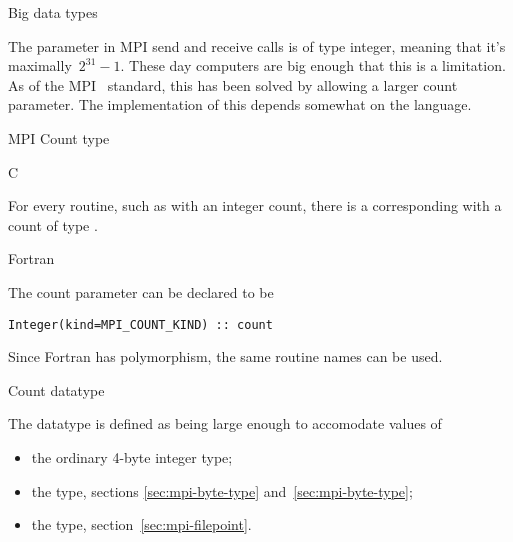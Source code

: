 
 {Big data types}
\label{sec:mpi-bigdata}

The  parameter in MPI send and receive calls is of type integer,
meaning that it's maximally~$2^{31}-1$. These day computers are big enough
that this is a limitation.
As of the MPI~ standard, this has been solved by allowing a
larger count parameter.
The implementation of this depends somewhat on the language.

\begin{mpifournote}{MPI Count type}

 {C}
\label{sec:c-mpi-count}

For every routine, such as  with an integer count,
there is a corresponding  with a count
of type .


 {Fortran}

The count parameter can be declared  to be
\begin{lstlisting}
Integer(kind=MPI_COUNT_KIND) :: count
\end{lstlisting}
Since Fortran has polymorphism, the same routine names can be used.

\end{mpifournote}

 {Count datatype}

The  datatype is defined as being large enough
to accomodate values of
\begin{itemize}
\item the ordinary 4-byte integer type;
\item the  type, sections
  \ref{sec:mpi-byte-type} and~\ref{sec:mpi-byte-type};
\item the  type, section~\ref{sec:mpi-filepoint}.
\end{itemize}

